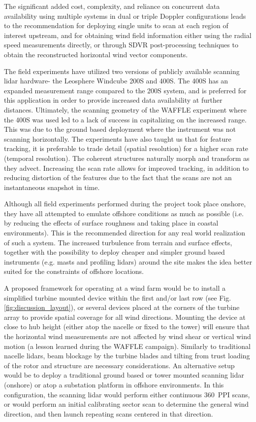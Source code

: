 The significant added cost, complexity, and reliance on concurrent data availability using multiple systems in dual or triple Doppler configurations leads to the recommendation for deploying single units to scan at each region of interest upstream, and for obtaining wind field information either using the radial speed measurements directly, or through SDVR post-processing techniques to obtain the reconstructed horizontal wind vector components.

The field experiments have utilized two versions of publicly available scanning lidar hardware- the Leosphere Windcube 200S and 400S. The 400S has an expanded measurement range compared to the 200S system, and is preferred for this application in order to provide increased data availability at further distances. Ultimately, the scanning geometry of the WAFFLE experiment where the 400S was used led to a lack of success in capitalizing on the increased range. This was due to the ground based deployment where the instrument was not scanning horizontally. The experiments have also taught us that for feature tracking, it is preferable to trade detail (spatial resolution) for a higher scan rate (temporal resolution). The coherent structures naturally morph and transform as they advect. Increasing the scan rate allows for improved tracking, in addition to reducing distortion of the features due to the fact that the scans are not an instantaneous snapshot in time.

Although all field experiments performed during the project took place onshore, they have all attempted to emulate offshore conditions as much as possible (i.e. by reducing the effects of surface roughness and taking place in coastal environments). This is the recommended direction for any real world realization of such a system. The increased turbulence from terrain and surface effects, together with the possibility to deploy cheaper and simpler ground based instruments (e.g. masts and profiling lidars) around the site makes the idea better suited for the constraints of offshore locations.

A proposed framework for operating at a wind farm would be to install a simplified turbine mounted device within the first and/or last row (see Fig. \ref{fig:discussion_layout}), or several devices placed at the corners of the turbine array to provide spatial coverage for all wind directions. Mounting the device at close to hub height (either atop the nacelle or fixed to the tower) will ensure that the horizontal wind measurements are not affected by wind shear or vertical wind motion (a lesson learned during the WAFFLE campaign). Similarly to traditional nacelle lidars, beam blockage by the turbine blades and tilting from trust loading of the rotor and structure are necessary considerations. An alternative setup would be to deploy a traditional ground based or tower mounted scanning lidar (onshore) or atop a substation platform in offshore environments. In this configuration, the scanning lidar would perform either continuous 360\degree \ PPI scans, or would perform an initial calibrating sector scan to determine the general wind direction, and then launch repeating scans centered in that direction. 

